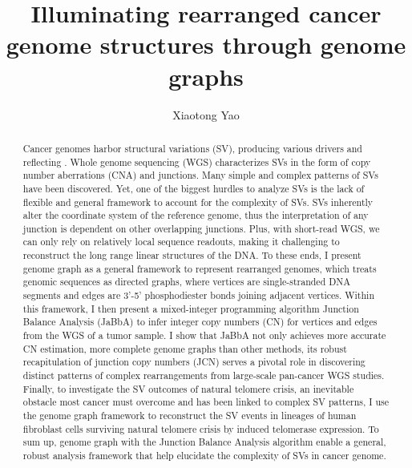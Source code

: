 \documentclass[phd,tocprelim]{cornell}
\title{Illuminating rearranged cancer genome structures through genome graphs}
\author {Xiaotong Yao}
\begin{document}
\maketitle
\makecopyright

\begin{abstract}
Cancer genomes harbor structural variations (SV), producing various drivers and reflecting . Whole genome sequencing (WGS) characterizes SVs in the form of copy number aberrations (CNA) and junctions. Many simple and complex patterns of SVs have been discovered. Yet, one of the biggest hurdles to analyze SVs is the lack of flexible and general framework to account for the complexity of SVs. SVs inherently alter the coordinate system of the reference genome, thus the interpretation of any junction is dependent on other overlapping junctions. Plus, with short-read WGS, we can only rely on relatively local sequence readouts, making it challenging to reconstruct the long range linear structures of the DNA. To these ends, I present genome graph as a general framework to represent rearranged genomes, which treats genomic sequences as directed graphs, where vertices are single-stranded DNA segments and edges are 3'-5' phosphodiester bonds joining adjacent vertices. Within this framework, I then present a mixed-integer programming algorithm Junction Balance Analysis (JaBbA) to infer integer copy numbers (CN) for vertices and edges from the WGS of a tumor sample. I show that JaBbA not only achieves more accurate CN estimation, more complete genome graphs than other methods, its robust recapitulation of junction copy numbers (JCN) serves a pivotal role in discovering distinct patterns of complex rearrangements from large-scale pan-cancer WGS studies. Finally, to investigate the SV outcomes of natural telomere crisis, an inevitable obstacle most cancer must overcome and has been linked to complex SV patterns, I use the genome graph framework to reconstruct the SV events in lineages of human fibroblast cells surviving natural telomere crisis by induced telomerase expression. To sum up, genome graph with the Junction Balance Analysis algorithm enable a general, robust analysis framework that help elucidate the complexity of SVs in cancer genome.
\end{abstract}
\end{document}
